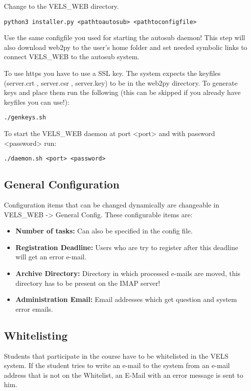 Change to the VELS\_WEB directory.

\begin{verbatim}
python3 installer.py <pathtoautosub> <pathtoconfigfile>
\end{verbatim}
Use the same configfile you used for starting the autosub daemon! This step will
also download web2py to the user's home folder and set needed symbolic links to 
connect VELS\_WEB to the autosub system.

To use https you have to use a SSL key. The system expects the keyfiles
(server.crt , server.csr , server.key) to be in the web2py directory. To
generate keys and place them run the following (this can be skipped if you 
already have keyfiles you can use!):

\begin{verbatim}
./genkeys.sh    
\end{verbatim}

To start the VELS\_WEB daemon at port <port> and with password <password> run:
\begin{verbatim}
./daemon.sh <port> <password> 
\end{verbatim}

\subsection{General Configuration}\label{sub:generalconfig}
Configuration items that can be changed dynamically are changeable in VELS\_WEB ->
General Config. These configurable items are:
\begin{itemize}
\item {\bf Number of tasks: }Can also be specified in the config file.
\item {\bf Registration Deadline: } Users who are try to register after this deadline will
    get an error e-mail.
\item {\bf Archive Directory: } Directory in which processed e-mails are moved, this
    directory has to be present on the IMAP server!
\item {\bf Administration Email: } Email addresses which get question and system error emails.

\end{itemize}

\subsection{Whitelisting} \label{sub:whitelisting}
Students that participate in the course have to be whitelisted in the VELS system. If the student
tries to write an e-mail to the system from an e-mail address that is not on the Whitelist, an E-Mail
with an error message is sent to him.

